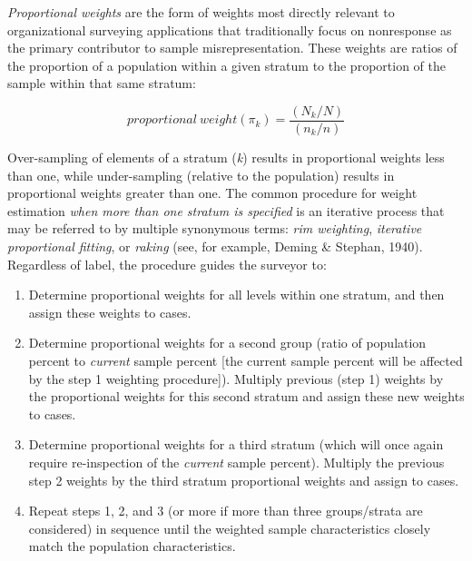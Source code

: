 \documentclass[
  man,floatsintext]{apa7}
\begin{document}
\emph{Proportional weights} are the form of weights most directly relevant to organizational surveying applications that traditionally focus on nonresponse as the primary contributor to sample misrepresentation. These weights are ratios of the proportion of a population within a given stratum to the proportion of the sample within that same stratum:

\begin{equation}
proportional \: weight(\pi_k) = \frac{(N_k/N)}{(n_k/n)}
\end{equation}

Over-sampling of elements of a stratum (\emph{k}) results in proportional weights less than one, while under-sampling (relative to the population) results in proportional weights greater than one.
The common procedure for weight estimation \emph{when more than one stratum is specified} is an iterative process that may be referred to by multiple synonymous terms: \emph{rim weighting}, \emph{iterative proportional fitting}, or \emph{raking} (see, for example, Deming \& Stephan, 1940). Regardless of label, the procedure guides the surveyor to:

\begin{enumerate}
\def\labelenumi{\arabic{enumi})}
\item
  Determine proportional weights for all levels within one stratum, and then assign these weights to cases.
\item
  Determine proportional weights for a second group (ratio of population percent to \emph{current} sample percent {[}the current sample percent will be affected by the step 1 weighting procedure{]}). Multiply previous (step 1) weights by the proportional weights for this second stratum and assign these new weights to cases.
\item
  Determine proportional weights for a third stratum (which will once again require re-inspection of the \emph{current} sample percent). Multiply the previous step 2 weights by the third stratum proportional weights and assign to cases.
\item
  Repeat steps 1, 2, and 3 (or more if more than three groups/strata are considered) in sequence until the weighted sample characteristics closely match the population characteristics.
\end{enumerate}
\end{document}
